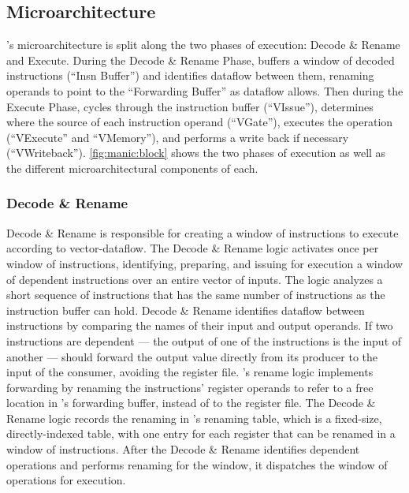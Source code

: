 \subsection{Microarchitecture}
\label{manic:manic:uarch}
\manic's microarchitecture is split along the two phases of execution: Decode \& Rename and Execute.
% 
During the Decode \& Rename Phase, \manic buffers a window of decoded instructions (``Insn Buffer'') and identifies dataflow between them, renaming operands to point to the ``Forwarding Buffer'' as dataflow allows.
% 
Then during the Execute Phase, \manic cycles through the instruction buffer (``VIssue''), determines where the source of each instruction operand (``VGate''), executes the operation (``VExecute'' and ``VMemory''), and performs a write back if necessary (``VWriteback'').
%
\autoref{fig:manic:block} shows the two phases of execution as well as the different microarchitectural components of each.

\figMANICBlock

\subsubsection{Decode \& Rename}
Decode \& Rename is responsible for creating a window of
instructions to execute according to vector-dataflow.
%
The Decode \& Rename logic activates once per window of instructions, identifying,
preparing, and issuing for execution a window of dependent instructions over an entire vector of inputs.
%
%
The logic analyzes a short sequence of instructions that has the same
number of instructions as the instruction buffer can hold. 
%
Decode \& Rename identifies dataflow between instructions by comparing the names
of their input and output operands. 
%
If two instructions are dependent --- the output of one of the instructions is 
the input of another ---  \manic should forward the output value directly from
its producer to the input of the consumer, avoiding the register file.
\manic's rename logic implements forwarding by renaming the instructions' register operands 
to refer to a free location in \manic's forwarding
buffer, instead of to the register file. 
%
The Decode \& Rename logic records the renaming in \manic's renaming table, which is a
fixed-size, directly-indexed table, with one entry for each register that can
be renamed in a window of instructions.
%
After the Decode \& Rename identifies dependent operations and performs renaming for the window, it dispatches the window of operations for execution.


